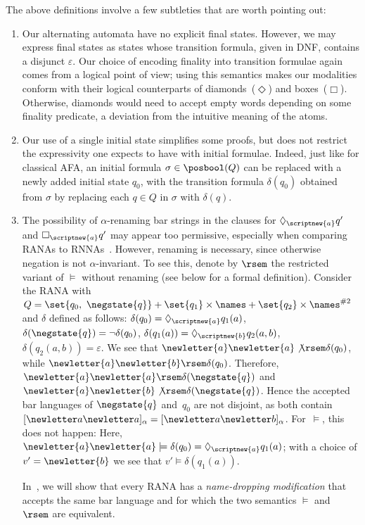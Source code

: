\documentclass[10pt, final, conference, a4paper, twocolumn]{IEEEtran}
\begin{document}
\begin{rem}\label{ex:restrictedsemantics}
The above definitions involve a few subtleties that are worth pointing out:
  \begin{enumerate}
    \item\label{rem:ranadefn:6} Our alternating automata have no explicit final states.
      However, we may express final states as states whose transition formula, given in DNF, contains a disjunct $\varepsilon$.
      Our choice of encoding finality into transition formulae again comes from a logical point of view; using this semantics makes our modalities conform with their logical counterparts of diamonds~($\Diamond$) and boxes~($\Box$).
      Otherwise, diamonds would need to accept empty words depending on some finality predicate, a deviation from the intuitive meaning of the atoms. 
    \item Our use of a single initial state simplifies some proofs, but does not restrict the expressivity one expects to have with initial formulae.
      Indeed, just like for classical AFA, an initial formula $\sigma \in \posbool(Q)$ can be replaced with a newly added initial state $q_0$, with the transition
      formula $\delta(q_0)$ obtained from $\sigma$ by replacing each $q\in Q$ in $\sigma$ with $\delta(q)$.
    \item  The possibility of $\alpha$-renaming bar strings in the clauses for $\Diamond_{\scriptnew{a}} q'$ and $\Box_{\scriptnew{a}} q'$ may appear too permissive, especially when comparing RANAs
      to RNNAs~\cite{skmw17}. However, renaming is necessary, since otherwise negation is not $\alpha$-invariant. To see this, denote by $\rsem$ the restricted variant of $\models$ without renaming (see  below for a formal definition). Consider the RANA with 
      $Q = \set{q_0,\ \negstate{q}} + \set{q_1} \times \names + \set{q_2} \times \names^{\# 2}$ and $\delta$ defined
      as follows: $\delta(q_0) = \Diamond_{\scriptnew{a}} q_1(a)$, $\delta(\negstate{q}) = \neg\delta(q_0)$,
      $\delta(q_1(a)) = \Diamond_{\scriptnew{b}} q_2(a, b)$, $\delta(q_2(a, b)) = \varepsilon$. We see that $\newletter{a}\newletter{a} \not\rsem \delta(q_0)$, while $\newletter{a}\newletter{b} \rsem
      \delta(q_0)$. Therefore, $\newletter{a}\newletter{a} \rsem \delta(\negstate{q})$ and
      $\newletter{a}\newletter{b} \not\rsem \delta(\negstate{q})$. Hence the accepted bar languages of $\negstate{q}$
      and~$q_0$ are not disjoint, as both contain $[\newletter a \newletter a]_\alpha=[\newletter a \newletter b]_\alpha$. For~$\models$, this does not happen: Here, $\newletter{a}\newletter{a} \models \delta(q_0) =
      \Diamond_{\scriptnew{a}} q_1(a)$; with a choice of $v' = \newletter{b}$ we see that $v' \models
      \delta(q_1(a))$. 

      In~, we will show that every RANA has a \emph{name-dropping modification} that accepts the same bar language and for which the two semantics $\models$ and $\rsem$ are equivalent.
    \end{enumerate}
\end{rem}
\end{document}

